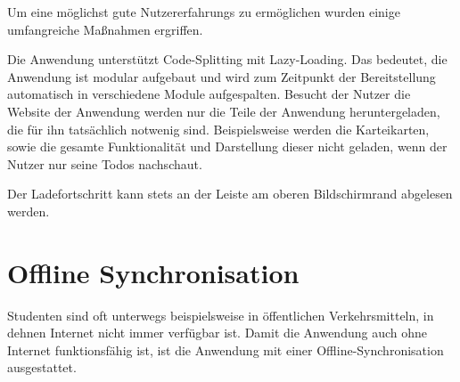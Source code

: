 
Um eine möglichst gute Nutzererfahrungs zu ermöglichen wurden einige umfangreiche Maßnahmen ergriffen.






Die Anwendung unterstützt Code-Splitting mit Lazy-Loading.
Das bedeutet, die Anwendung ist modular aufgebaut und wird zum Zeitpunkt der Bereitstellung automatisch in verschiedene Module aufgespalten.
Besucht der Nutzer die Website der Anwendung werden nur die Teile der Anwendung heruntergeladen, die für ihn tatsächlich notwenig sind.
Beispielsweise werden die Karteikarten, sowie die gesamte Funktionalität und Darstellung dieser nicht geladen, wenn der Nutzer nur seine Todos nachschaut.






Der Ladefortschritt kann stets an der Leiste am oberen Bildschirmrand abgelesen werden.



\section{Offline Synchronisation}
Studenten sind oft unterwegs beispielsweise in öffentlichen Verkehrsmitteln, in dehnen Internet nicht immer verfügbar ist.
Damit die Anwendung auch ohne Internet funktionsfähig ist, ist die Anwendung mit einer Offline-Synchronisation ausgestattet.






